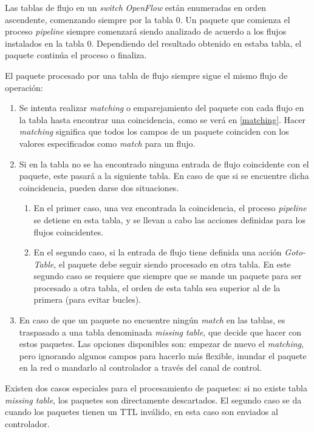 \documentclass[a4paper,11pt]{book}
\begin{document}
\begin{itemize}
Las tablas de flujo en un \textit{switch} \emph{OpenFlow} están enumeradas en orden ascendente, comenzando siempre por la tabla 0. Un paquete que comienza el proceso \textit{pipeline} siempre comenzará siendo analizado de acuerdo a los flujos instalados en la tabla 0. Dependiendo del resultado obtenido en estaba tabla, el paquete continúa el proceso o finaliza.

El paquete procesado por una tabla de flujo siempre sigue el mismo flujo de operación:

\begin{enumerate}
\item Se intenta realizar \textit{matching} o emparejamiento del paquete con cada flujo en la tabla hasta encontrar una coincidencia, como se verá en \ref{matching}. Hacer \textit{matching} significa que todos los campos de un paquete coinciden con los valores especificados como \textit{match} para un flujo.
\item Si en la tabla no se ha encontrado ninguna entrada de flujo coincidente con el paquete, este pasará a la siguiente tabla. En caso de que si se encuentre dicha coincidencia, pueden darse dos situaciones.

\begin{enumerate}
\item En el primer caso, una vez encontrada la coincidencia, el proceso \textit{pipeline} se detiene en esta tabla, y se llevan a cabo las acciones definidas para los flujos coincidentes.
\item En el segundo caso, si la entrada de flujo tiene definida una acción \textit{Goto-Table}, el paquete debe seguir siendo procesado en otra tabla. En este segundo caso se requiere que siempre que se mande un paquete para ser procesado a otra tabla, el orden de esta tabla sea superior al de la primera (para evitar bucles).
\end{enumerate}
\item En caso de que un paquete no encuentre ningún \textit{match} en las tablas, es traspasado a una tabla denominada \textit{missing table}, que decide que hacer con estos paquetes. Las opciones disponibles son: empezar de nuevo el \textit{matching}, pero ignorando algunos campos para hacerlo más flexible, inundar el paquete en la red o mandarlo al controlador a través del canal de control.
\end{enumerate}

Existen dos casos especiales para el procesamiento de paquetes: si no existe tabla \textit{missing table}, los paquetes son directamente descartados. El segundo caso se da cuando los paquetes tienen un \ac{TTL} inválido, en esta caso son enviados al controlador.


\end{itemize}
\end{document}
